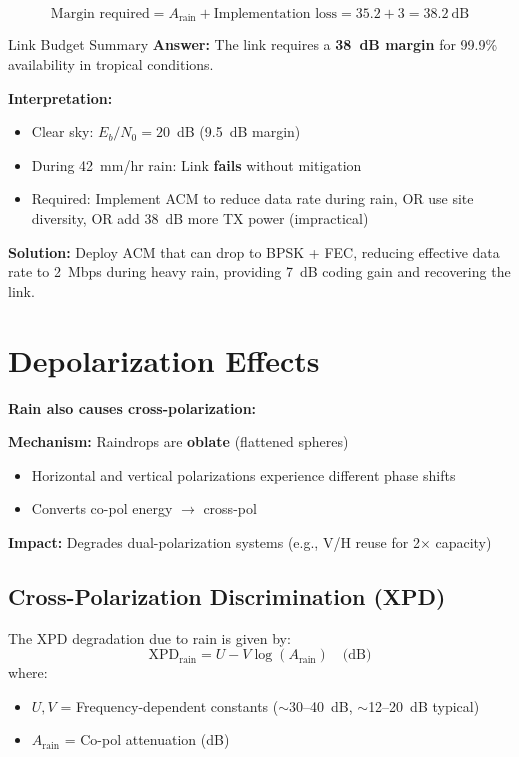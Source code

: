 \begin{equation}
\text{Margin required} = A_{\text{rain}} + \text{Implementation loss} = 35.2 + 3 = 38.2~\text{dB}
\end{equation}

\begin{calloutbox}[colback=black!8!white,colframe=black]{Link Budget Summary}
\textbf{Answer:} The link requires a \textbf{38~dB margin} for 99.9\% availability in tropical conditions.

\textbf{Interpretation:}
\begin{itemize}
\item Clear sky: $E_b/N_0 = 20$~dB (9.5~dB margin)
\item During 42~mm/hr rain: Link \textbf{fails} without mitigation
\item Required: Implement ACM to reduce data rate during rain, OR use site diversity, OR add 38~dB more TX power (impractical)
\end{itemize}

\textbf{Solution:} Deploy ACM that can drop to BPSK + FEC, reducing effective data rate to 2~Mbps during heavy rain, providing 7~dB coding gain and recovering the link.
\end{calloutbox}

\section{Depolarization Effects}

\textbf{Rain also causes cross-polarization:}

\textbf{Mechanism:} Raindrops are \textbf{oblate} (flattened spheres)
\begin{itemize}
\item Horizontal and vertical polarizations experience different phase shifts
\item Converts co-pol energy $\rightarrow$ cross-pol
\end{itemize}

\textbf{Impact:} Degrades dual-polarization systems (e.g., V/H reuse for 2$\times$ capacity)

\subsection{Cross-Polarization Discrimination (XPD)}

The XPD degradation due to rain is given by:
\begin{equation}
\text{XPD}_{\text{rain}} = U - V \log(A_{\text{rain}}) \quad \text{(dB)}
\end{equation}
where:
\begin{itemize}
\item $U, V$ = Frequency-dependent constants ($\sim$30--40~dB, $\sim$12--20~dB typical)
\item $A_{\text{rain}}$ = Co-pol attenuation (dB)
\end{itemize}

